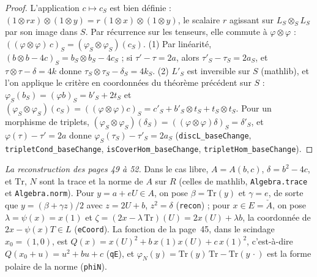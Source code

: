 \begin{proof}
L'application $c \mapsto c_S$ est bien définie : $(1 \otimes rx) \otimes (1 \otimes y) = r\,(1 \otimes x) \otimes (1 \otimes y)$, le scalaire $r$ agissant sur $L_S \otimes_S L_S$ par son image dans $S$. Par récurrence sur les tenseurs, elle commute à $\varphi \otimes \varphi$ : $((\varphi \otimes \varphi)\,c)_S = (\varphi_S \otimes \varphi_S)(c_S)$. (1) Par linéarité, $(b \otimes b - 4c)_S = b_S \otimes b_S - 4c_S$ ; si $\tau' - \tau = 2a$, alors $\tau'_S - \tau_S = 2a_S$, et $\tau \otimes \tau - \delta = 4k$ donne $\tau_S \otimes \tau_S - \delta_S = 4k_S$. (2) $L'_S$ est inversible sur $S$ (mathlib), et l'on applique le critère en coordonnées du théorème précédent sur $S$ : $\varphi_S(b_S) = (\varphi b)_S = b'_S + 2t_S$ et $(\varphi_S \otimes \varphi_S)(c_S) = ((\varphi \otimes \varphi)c)_S = c'_S + b'_S \otimes t_S + t_S \otimes t_S$. Pour un morphisme de triplets, $(\varphi_S \otimes \varphi_S)(\delta_S) = ((\varphi \otimes \varphi)\delta)_S = \delta'_S$, et $\varphi(\tau) - \tau' = 2a$ donne $\varphi_S(\tau_S) - \tau'_S = 2a_S$ (\texttt{discL\_baseChange}, \texttt{tripletCond\_baseChange}, \texttt{isCoverHom\_baseChange}, \texttt{tripletHom\_baseChange}).
\end{proof}

\noindent\emph{La reconstruction des pages 49 à 52.} Dans le cas libre, $A = A(b, c)$, $\delta = b^2 - 4c$, et $\mathrm{Tr}$, $N$ sont la trace et la norme de $A$ sur $R$ (celles de mathlib, \texttt{Algebra.\allowbreak{}trace} et \texttt{Algebra.\allowbreak{}norm}). Pour $y = a + eU \in A$, on pose $\beta = \mathrm{Tr}(y)$ et $\gamma = e$, de sorte que $y = (\beta + \gamma z)/2$ avec $z = 2U + b$, $z^2 = \delta$ (\texttt{recon}) ; pour $x \in E = \check A$, on pose $\lambda = \psi(x) = x(1)$ et $\zeta = (2x - \lambda\,\mathrm{Tr})(U) = 2x(U) + \lambda b$, la coordonnée de $2x - \psi(x)T \in L$ (\texttt{eCoord}). La fonction de la page~45, dans le scindage $x_0 = (1, 0)$, est $Q(x) = x(U)^2 + b\,x(1)x(U) + c\,x(1)^2$, c'est-à-dire $Q(x_0 + u) = u^2 + bu + c$ (\texttt{qE}), et $\varphi_N(y) = \mathrm{Tr}(y)\,\mathrm{Tr} - \mathrm{Tr}(y\,\cdot)$ est la forme polaire de la norme (\texttt{phiN}).

